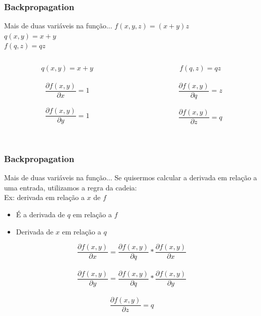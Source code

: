 \documentclass{beamer}
\begin{document}
\begin{frame}
	\frametitle{Backpropagation}
	\begin{block}{Mais de duas variáveis na função...}
		$f(x,y,z) = (x+y)z$ \\
		$q(x,y) = x+y$ \\
		$f(q,z) = qz$ \\
	\end{block}
\begin{example}
	\begin{columns}
		\begin{column}{0.35\textwidth}
			$$q(x,y) = x+y$$ \\
			$$\frac{\partial f(x,y)}{\partial x} = 1$$ \\
			$$\frac{\partial f(x,y)}{\partial y} = 1$$ \\
		\end{column}
		\begin{column}{0.35\textwidth}
			$$f(q,z) = qz$$ \\
			$$\frac{\partial f(x,y)}{\partial q} = z$$ \\
			$$\frac{\partial f(x,y)}{\partial z} = q$$ \\
		\end{column}
	\end{columns}
\end{example}
\end{frame}
\begin{frame}
	\frametitle{Backpropagation}
	\begin{block}{Mais de duas variáveis na função...}
		Se quisermos calcular a derivada em relação a uma entrada, utilizamos a regra da cadeia: \\
		Ex: derivada em relação a $x$ de $f$
		\begin{itemize}
			\item É a derivada de $q$ em relação a $f$ 
			\item Derivada de $x$ em relação a $q$
		\end{itemize}
	\end{block}
	\begin{example}
				$$\frac{\partial f(x,y)}{\partial x} = \frac{\partial f(x,y)}{\partial q} * \frac{\partial f(x,y)}{\partial x}$$ \\
				$$\frac{\partial f(x,y)}{\partial y} = \frac{\partial f(x,y)}{\partial q} * \frac{\partial f(x,y)}{\partial y}$$ \\
				$$\frac{\partial f(x,y)}{\partial z} = q$$ 
	\end{example}
\end{frame}
\end{document}
